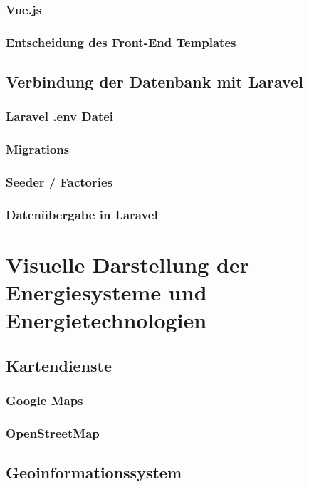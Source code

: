 \subsubsection{Vue.js}
\subsubsection{Entscheidung des Front-End Templates}


\subsection{Verbindung der Datenbank mit Laravel}
\subsubsection{Laravel .env Datei }
\subsubsection{Migrations}
\subsubsection{Seeder / Factories}
\subsubsection{Datenübergabe in Laravel}


\section {Visuelle Darstellung der Energiesysteme und Energietechnologien }

\subsection{Kartendienste}

\subsubsection{Google Maps}
\subsubsection{OpenStreetMap}

\subsection{Geoinformationssystem }

